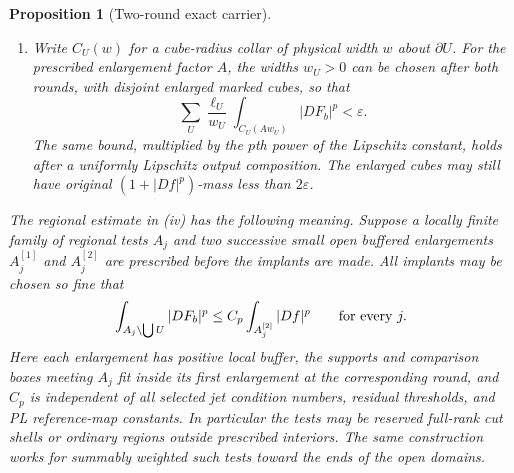 \documentclass[11pt]{article}
\numberwithin{equation}{section}
\newtheorem{proposition}[theorem]{Proposition}
\theoremstyle{definition}
\theoremstyle{remark}
\begin{document}
\begin{proposition}[Two-round exact carrier]
\begin{enumerate}[label=\textup{(\roman*)}]
\begin{equation}
 \int_{\bigcup U}(1+|Df|^p)<\varepsilon.
\end{equation}
For $p\geq3$ this family is empty.  Off the marked cubes the energy
has the universal buffered regional estimate described below.
\item Write $C_U(w)$ for a cube-radius collar of physical width $w$
about $\partial U$.  For the prescribed enlargement factor $A$, the
widths $w_U>0$ can be chosen after both rounds, with disjoint enlarged
marked cubes, so that
\begin{equation}\label{hp:marked-collar-budget}
 \sum_U\frac{\ell_U}{w_U}
             \int_{C_U(Aw_U)}|DF_b|^p<\varepsilon.
\end{equation}
The same bound, multiplied by the $p$th power of the Lipschitz
constant, holds after a uniformly Lipschitz output composition.
The enlarged cubes may still have original $(1+|Df|^p)$-mass less
than $2\varepsilon$.
\end{enumerate}

The regional estimate in \textup{(iv)} has the following meaning.
Suppose a locally finite family of regional tests $A_j$ and two
successive small open buffered enlargements $A_j^{[1]}$ and
$A_j^{[2]}$ are prescribed before the implants are made.  All implants
may be chosen so fine that
\begin{equation}\label{hp:regional-energy}
 \int_{A_j\setminus\bigcup U}|DF_b|^p
       \leq C_p\int_{A_j^{[2]}}|Df|^p
       \qquad\hbox{for every }j.
\end{equation}
Here each enlargement has positive local buffer, the supports and
comparison boxes meeting $A_j$ fit inside its first enlargement at
the corresponding round, and $C_p$ is independent of all selected
jet condition numbers, residual thresholds, and PL reference-map
constants.  In particular the tests may be reserved full-rank cut
shells or ordinary regions outside prescribed interiors.  The same
construction works for summably weighted such tests toward the ends
of the open domains.
\end{proposition}
\end{document}
